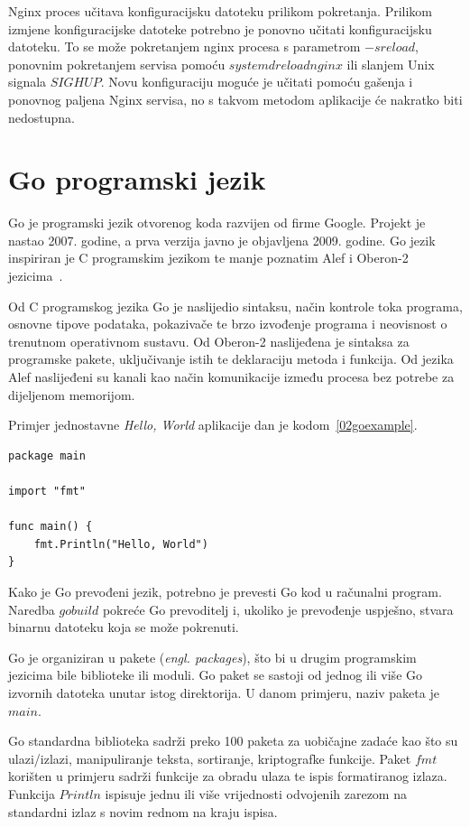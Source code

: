 Nginx proces učitava konfiguracijsku datoteku prilikom pokretanja. Prilikom izmjene konfiguracijske
datoteke potrebno je ponovno učitati konfiguracijsku datoteku. To se može pokretanjem nginx procesa
s parametrom $-s reload$, ponovnim pokretanjem servisa pomoću $systemd reload nginx$ ili slanjem
Unix signala $SIGHUP$. Novu konfiguraciju moguće je učitati pomoću gašenja i ponovnog paljena Nginx
servisa, no s takvom metodom aplikacije će nakratko biti nedostupna.

\section{Go programski jezik}
Go je programski jezik otvorenog koda razvijen od firme Google. Projekt je nastao 2007. godine, a
prva verzija javno je objavljena 2009. godine. Go jezik inspiriran je C programskim jezikom te manje
poznatim Alef i Oberon-2 jezicima~\citep{donovan2015go}.

Od C programskog jezika Go je naslijedio sintaksu, način kontrole toka programa, osnovne tipove
podataka, pokazivače te brzo izvođenje programa i neovisnost o trenutnom operativnom sustavu.
Od Oberon-2 naslijeđena je sintaksa za programske pakete, uključivanje istih te deklaraciju metoda
i funkcija. Od jezika Alef naslijeđeni su kanali kao način komunikacije između procesa bez potrebe
za dijeljenom memorijom.

Primjer jednostavne \textit{Hello, World} aplikacije dan je kodom~\ref{02goexample}.

\begin{lstlisting}[float=h]
package main

import "fmt"

func main() {
    fmt.Println("Hello, World")
}
\end{lstlisting}

Kako je Go prevođeni jezik, potrebno je prevesti Go kod u računalni program. Naredba $go build$
pokreće Go prevoditelj i, ukoliko je prevođenje uspješno, stvara binarnu datoteku koja se može
pokrenuti.

Go je organiziran u pakete (\textit{engl. packages}), što bi u drugim programskim jezicima bile
biblioteke ili moduli. Go paket se sastoji od jednog ili više Go izvornih datoteka unutar istog
direktorija. U danom primjeru, naziv paketa je $main$.

Go standardna biblioteka sadrži preko 100 paketa za uobičajne zadaće kao što su ulazi/izlazi,
manipuliranje teksta, sortiranje, kriptografke funkcije. Paket $fmt$ korišten u primjeru sadrži
funkcije za obradu ulaza te ispis formatiranog izlaza. Funkcija $Println$ ispisuje jednu ili više
vrijednosti odvojenih zarezom na standardni izlaz s novim rednom na kraju ispisa.


